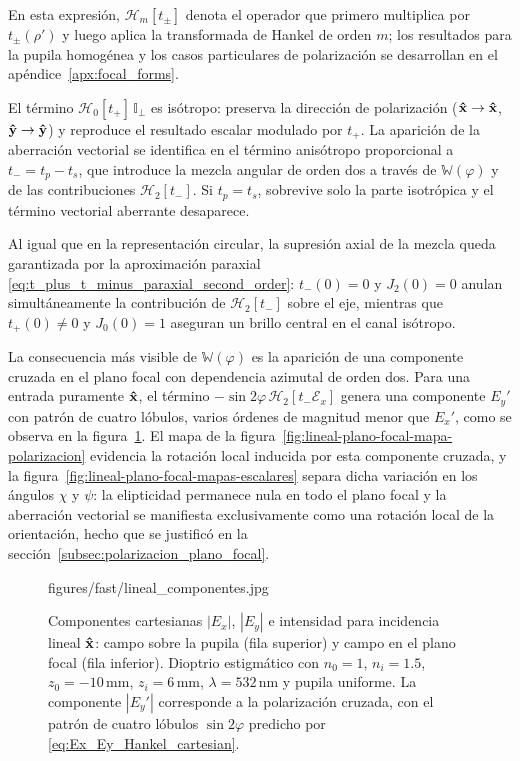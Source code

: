 En esta expresión, $\mathscr H_m[t_\pm]$ denota el operador que primero
multiplica por $t_\pm(\rho')$ y luego aplica la transformada de Hankel de
orden $m$; los resultados para la pupila homogénea y los casos particulares de polarización se desarrollan en el apéndice~\ref{apx:focal_forms}.

El término $\mathscr{H}_0[t_+]\,\mathbb{I}_\perp$ es isótropo: preserva la dirección de polarización ($\bm{\hat{\mathbf{x}}}\to\bm{\hat{\mathbf{x}}}$, $\bm{\hat{\mathbf{y}}}\to\bm{\hat{\mathbf{y}}}$) y reproduce el resultado escalar modulado por $t_+$. La aparición de la aberración vectorial se identifica en el término anisótropo proporcional a $t_-=t_p-t_s$, que introduce la mezcla angular de orden dos a través de $\mathbb{W}(\varphi)$ y de las contribuciones $\mathscr{H}_2[t_-]$. Si $t_p=t_s$, sobrevive solo la parte isotrópica y el término vectorial aberrante desaparece.

Al igual que en la representación circular, la supresión axial de la mezcla queda garantizada por la aproximación paraxial \eqref{eq:t_plus_t_minus_paraxial_second_order}: $t_-(0)=0$ y $J_2(0)=0$ anulan simultáneamente la contribución de $\mathscr{H}_2[t_-]$ sobre el eje, mientras que $t_+(0)\neq 0$ y $J_0(0)=1$ aseguran un brillo central en el canal isótropo.

La consecuencia más visible de $\mathbb{W}(\varphi)$ es la aparición de una componente cruzada en el plano focal con dependencia azimutal de orden dos. Para una entrada puramente $\bm{\hat{\mathbf{x}}}$, el término $-\sin 2\varphi\,\mathscr{H}_2[t_-\mathscr{E}_x]$ genera una componente $E_y'$ con patrón de cuatro lóbulos, varios órdenes de magnitud menor que $E_x'$, como se observa en la figura~\ref{fig:lineal-plano-focal-componentes}. El mapa de la figura~\ref{fig:lineal-plano-focal-mapa-polarizacion} evidencia la rotación local inducida por esta componente cruzada, y la figura~\ref{fig:lineal-plano-focal-mapas-escalares} separa dicha variación en los ángulos $\chi$ y $\psi$: la elipticidad permanece nula en todo el plano focal y la aberración vectorial se manifiesta exclusivamente como una rotación local de la orientación, hecho que se justificó en la sección~\ref{subsec:polarizacion_plano_focal}.

\begin{figure}[H]
  \centering
    {figures/fast/lineal_componentes.jpg}
  \caption{Componentes cartesianas $|E_x|$, $|E_y|$ e intensidad para incidencia lineal $\bm{\hat{\mathbf{x}}}$: campo sobre la pupila (fila superior) y campo en el plano focal (fila inferior). Dioptrio estigmático con $n_0=1$, $n_i=1.5$, $z_0=-10\,\mathrm{mm}$, $z_i=6\,\mathrm{mm}$, $\lambda=532\,\mathrm{nm}$ y pupila uniforme. La componente $|E_y'|$ corresponde a la polarización cruzada, con el patrón de cuatro lóbulos $\sin 2\varphi$ predicho por \eqref{eq:Ex_Ey_Hankel_cartesian}.}
  \label{fig:lineal-plano-focal-componentes}
\end{figure}

